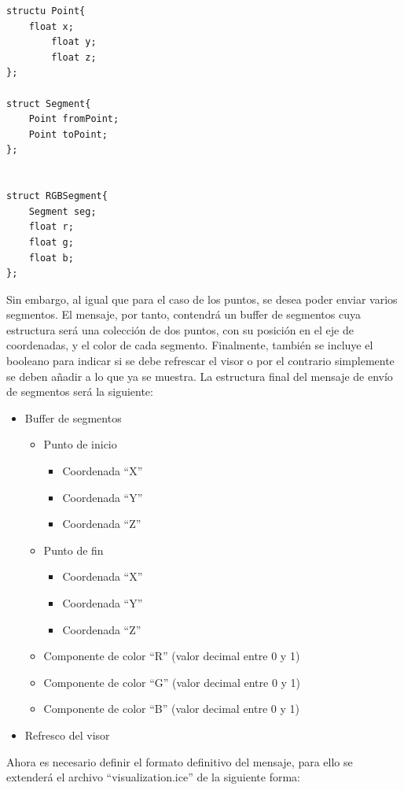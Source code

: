 \begin{lstlisting}[frame=single]
structu Point{
	float x;
      	float y;
      	float z;
};

struct Segment{
	Point fromPoint;
	Point toPoint;
};


struct RGBSegment{
	Segment seg;
	float r;
	float g;
	float b;
};

\end{lstlisting}


Sin embargo, al igual que para el caso de los puntos, se desea poder enviar varios segmentos. El mensaje, por tanto, contendrá un buffer de segmentos cuya estructura será una colección de dos puntos, con su posición en el eje de coordenadas, y el color de cada segmento.
Finalmente, también se incluye el booleano para indicar si se debe refrescar el visor o por el contrario simplemente se deben añadir a lo que ya se muestra.
La estructura final del mensaje de envío de segmentos será la siguiente:
\begin{itemize}
	\item Buffer de segmentos
	\begin{itemize}
		\item Punto de inicio
		\begin{itemize}
			\item Coordenada ``X''
			\item Coordenada ``Y''
			\item Coordenada ``Z''
		\end{itemize}
		\item Punto de fin
		\begin{itemize}
			\item Coordenada ``X''
			\item Coordenada ``Y''
			\item Coordenada ``Z''
		\end{itemize}
		\item Componente de color ``R'' (valor decimal entre 0 y 1)
		\item Componente de color ``G'' (valor decimal entre 0 y 1)
		\item Componente de color ``B'' (valor decimal entre 0 y 1)
	\end{itemize}
	\item Refresco del visor
\end{itemize}

Ahora es necesario definir el formato definitivo del mensaje, para ello se extenderá el archivo ``visualization.ice'' de la siguiente forma:

